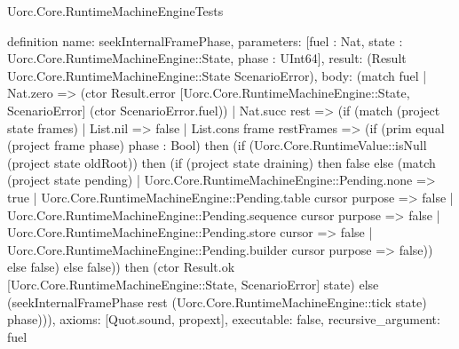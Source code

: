 \begin{lexlean}{Uorc.Core.RuntimeMachineEngineTests}
\begin{semanticmodule}
definition{
  name: seekInternalFramePhase,
  parameters: [fuel : Nat, state : Uorc.Core.RuntimeMachineEngine::State, phase : UInt64],
  result: (Result Uorc.Core.RuntimeMachineEngine::State ScenarioError),
  body: (match fuel
    | Nat.zero => (ctor Result.error [Uorc.Core.RuntimeMachineEngine::State, ScenarioError] (ctor ScenarioError.fuel))
    | Nat.succ rest => (if (match (project state frames)
      | List.nil => false
      | List.cons frame restFrames => (if (prim equal (project frame phase) phase : Bool) then (if (Uorc.Core.RuntimeValue::isNull (project state oldRoot)) then (if (project state draining) then false else (match (project state pending)
        | Uorc.Core.RuntimeMachineEngine::Pending.none => true
        | Uorc.Core.RuntimeMachineEngine::Pending.table cursor purpose => false
        | Uorc.Core.RuntimeMachineEngine::Pending.sequence cursor purpose => false
        | Uorc.Core.RuntimeMachineEngine::Pending.store cursor => false
        | Uorc.Core.RuntimeMachineEngine::Pending.builder cursor purpose => false)) else false) else false)) then (ctor Result.ok [Uorc.Core.RuntimeMachineEngine::State, ScenarioError] state) else (seekInternalFramePhase rest (Uorc.Core.RuntimeMachineEngine::tick state) phase))),
  axioms: [Quot.sound, propext],
  executable: false,
  recursive_argument: fuel
}


\end{semanticmodule}
\end{lexlean}
